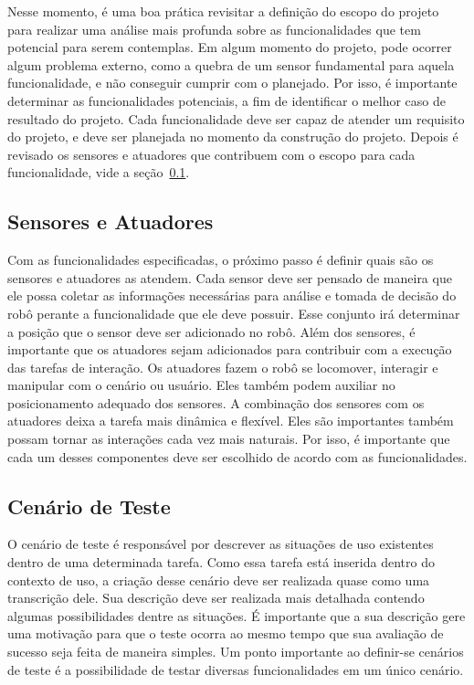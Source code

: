 Nesse momento, é uma boa prática revisitar a definição do escopo do projeto para realizar uma análise mais profunda sobre as funcionalidades que tem potencial para serem contemplas. Em algum momento do projeto, pode ocorrer algum problema externo, como a quebra de um sensor fundamental para aquela funcionalidade, e não conseguir cumprir com o planejado. Por isso, é importante determinar as funcionalidades potenciais, a fim de identificar o melhor caso de resultado do projeto. Cada funcionalidade deve ser capaz de atender um requisito do projeto, e deve ser planejada no momento da construção do projeto. Depois é revisado os sensores e atuadores que contribuem com o escopo para cada funcionalidade, vide a seção~\ref{sec:sensoresatuadores}.

\subsection{Sensores e Atuadores}
\label{sec:sensoresatuadores} 
Com as funcionalidades especificadas, o próximo passo é definir quais são os sensores e atuadores as atendem. Cada sensor deve ser pensado de maneira que ele possa coletar as informações necessárias para análise e tomada de decisão do robô perante a funcionalidade que ele deve possuir. Esse conjunto irá determinar a posição que o sensor deve ser adicionado no robô. Além dos sensores, é importante que os atuadores sejam adicionados para contribuir com a execução das tarefas de interação. Os atuadores fazem o robô se locomover, interagir e manipular com o cenário ou usuário. Eles também podem auxiliar no posicionamento adequado dos sensores. A combinação dos sensores com os atuadores deixa a tarefa mais dinâmica e flexível. Eles são importantes também possam tornar as interações cada vez mais naturais. Por isso, é importante que cada um desses componentes deve ser escolhido de acordo com as funcionalidades.

\subsection{Cenário de Teste}
\label{sec:cenarioteste}
O cenário de teste é responsável por descrever as situações de uso existentes dentro de uma determinada tarefa. Como essa tarefa está inserida dentro do contexto de uso, a criação desse cenário deve ser realizada quase como uma transcrição dele. Sua descrição deve ser realizada mais detalhada contendo algumas possibilidades dentre as situações. É importante que a sua descrição gere uma motivação para que o teste ocorra ao mesmo tempo que sua avaliação de sucesso seja feita de maneira simples. Um ponto importante ao definir-se cenários de teste é a possibilidade de testar diversas funcionalidades em um único cenário. 

